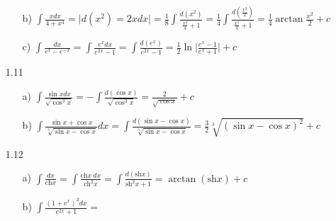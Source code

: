 \documentclass[a4paper,12pt]{article}
\begin{document}
\begin{itemize}
\begin{itemize}
	\item [b)] $\int\frac{xdx}{4+x^4}=\big|d(x^2)=2xdx\big|=\frac18\int \frac{d(x^2)}{\frac{x^4}{4}+1}=\frac14\int\frac{d(\frac{x^2}{2})}{\frac{x^4}{4}+1}=\frac14 \arctan \frac{x^2}{2}+c$
	\item [c)] $\int\frac{dx}{e^x-e^{-x}}=\int\frac{e^xdx}{e^{2x}-1}=\int\frac{d(e^x)}{e^{2x}-1}=\frac12\ln\big|\frac{e^x-1}{e^x+1}\big|+c$
	\end{itemize}
	\item [1.11] \begin{itemize}
	\item [a)] $\int\frac{\sin x dx}{\sqrt{\cos^3 x}}=-\int\frac{d(\cos x)}{\sqrt{\cos^3x}}=\frac{2}{\sqrt{\cos x}}+c$
	\item [b)] $\int\frac{\sin x+\cos x}{\sqrt[3]{\sin x-\cos x}}dx=\int\frac{d(\sin x-\cos x)}{\sqrt[3]{\sin x - \cos x}}=\frac32 \sqrt[3]{(\sin x-\cos x)^2}+c$
\end{itemize}
\item[1.12] \begin{itemize} 
\item [a)] $\int\frac{dx}{\textrm{ch}x}=\int\frac{\textrm{ch}x\>dx}{\textrm{ch}^2x}=\int\frac{d(\textrm{sh}x)}{\textrm{sh}^2x+1}=\arctan(\textrm{sh}x)+c$
\item [b)] $\int\frac{(1+e^x)^2dx}{e^{2x}+1}=$
\end{itemize}	
\end{itemize}
\end{document}
